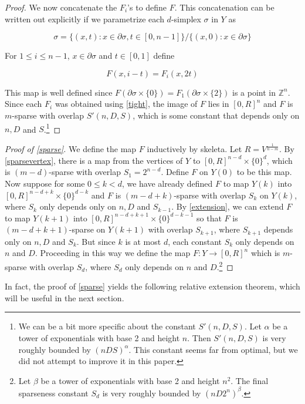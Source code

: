 \documentclass[12pt]{article}
\newcommand{\ZZ}{\mathbb{Z}}
\begin{document}
\begin{proof}
		We now concatenate the $F_i$'s to define $F$. This concatenation can be written out explicitly if we parametrize each $d$-simplex $\sigma$ in $Y$ as
		
		$$\sigma = \{(x, t): x \in \partial \sigma, t \in [0, n-1]\}/ \{(x, 0): x \in \partial \sigma\}$$
		
		\noindent For $1 \le i \le n-1$, $x \in \partial \sigma$ and $t \in [0,1]$ define
		
		$$F(x, i - t) = F_i(x, 2t)$$
		
		\noindent This map is well defined since $F(\partial \sigma \times \{0\}) = F_{1}(\partial \sigma \times \{2\})$ is a point in $\ZZ^n$. Since each $F_i$ was obtained using \cref{tight}, the image of $F$ lies in $[0,R]^n$ and $F$ is $m$-sparse with overlap $S'(n,D,S)$, which is some constant that depends only on $n, D$ and $S$.\footnote{We can be a bit more specific about the constant $S'(n,D,S)$. Let $\alpha$ be a tower of exponentials with base 2 and height $n$. Then $S'(n,D,S)$ is very roughly bounded by $(nDS)^{\alpha}$. This constant seems far from optimal, but we did not attempt to improve it in this paper.}
	\end{proof}
	
	\begin{proof}[Proof of \cref{sparse}] We define the map $F$ inductively by skeleta. Let $R = V^{\frac{1}{n-m}}$. By \cref{sparsevertex}, there is a map from the vertices of $Y$ to $[0,R]^{n-d} \times \{0\}^{d}$, which is $(m-d)$-sparse with overlap $S_1 = 2^{n-d}$. Define $F$ on $Y(0)$ to be this map. Now suppose for some $0 \le k < d$, we have already defined $F$ to map $Y(k)$ into $[0,R]^{n-d+k} \times \{0\}^{d-k}$ and $F$ is $(m-d+k)$-sparse with overlap $S_k$ on $Y(k)$, where $S_k$ only depends only on $n, D$ and $S_{k-1}$. By \cref{extension}, we can extend $F$ to map $Y(k+1)$ into  $[0,R]^{n-d+k+1} \times \{0\}^{d-k-1}$ so that $F$ is $(m-d+k+1)$-sparse on $Y(k+1)$ with overlap $S_{k+1}$, where $S_{k+1}$ depends only on $n, D$ and $S_{k}$. But since $k$ is at most $d$, each constant $S_{k}$ only depends on $n$ and $D$. Proceeding in this way we define the map $F: Y\to [0,R]^n$ which is $m$-sparse with overlap $S_d$, where $S_{d}$ only depends on $n$ and $D$.\footnote{Let $\beta$ be a tower of exponentials with base 2 and height $n^2$. The final sparseness constant $S_d$ is very roughly bounded by $(nD2^n)^{\beta}$.}
	\end{proof}
	
	In fact, the proof of \cref{sparse} yields the following relative extension theorem, which will be useful in the next section.
	
\end{document}
